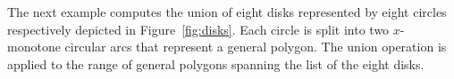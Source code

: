 The next example computes the union of eight disks represented by
eight circles respectively depicted in Figure~\ref{fig:disks}. Each
circle is split into two $x$-monotone circular arcs that represent a
general polygon. The union operation is applied to the range of
general polygons spanning the list of the eight disks.


